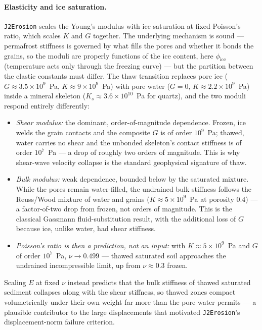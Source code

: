 \documentclass[12pt]{article}
\begin{document}
\paragraph{Elasticity and ice saturation.}
\texttt{J2Erosion} scales the Young's modulus with ice saturation at
fixed Poisson's ratio, which scales $K$ and $G$ together. The
underlying mechanism is sound --- permafrost stiffness is governed by
what fills the pores and whether it bonds the grains, so the moduli
are properly functions of the ice content, here $\phi_{\mathrm{ice}}$
(temperature acts only through the freezing curve) --- but the partition between the elastic constants
must differ. The thaw transition replaces pore ice
($G \approx 3.5 \times 10^{9}$~Pa, $K \approx 9 \times 10^{9}$~Pa)
with pore water ($G = 0$, $K \approx 2.2 \times 10^{9}$~Pa) inside a
mineral skeleton ($K_s \approx 3.6 \times 10^{10}$~Pa for quartz),
and the two moduli respond entirely differently:
\begin{itemize}
\item \emph{Shear modulus:} the dominant, order-of-magnitude
      dependence. Frozen, ice welds the grain contacts and the
      composite $G$ is of order $10^{9}$~Pa; thawed, water carries
      no shear and the unbonded skeleton's contact stiffness is of
      order $10^{7}$~Pa --- a drop of roughly two orders of
      magnitude. This is why shear-wave
      velocity collapse is the standard geophysical signature of
      thaw.
\item \emph{Bulk modulus:} weak dependence, bounded below by the
      saturated mixture. While the pores remain water-filled, the
      undrained bulk stiffness follows the Reuss/Wood mixture of
      water and grains ($K \approx 5 \times 10^{9}$~Pa at porosity
      $0.4$) --- a
      factor-of-two drop from frozen, not orders of magnitude. This
      is the classical Gassmann fluid-substitution result, with the
      additional loss of $G$ because ice, unlike water, had shear
      stiffness.
\item \emph{Poisson's ratio is then a prediction, not an input:}
      with $K \approx 5 \times 10^{9}$~Pa and $G$ of order
      $10^{7}$~Pa, $\nu \to 0.499$
      --- thawed saturated soil approaches the undrained
      incompressible limit, up from $\nu \approx 0.3$ frozen.
\end{itemize}
Scaling $E$ at fixed $\nu$ instead predicts that the bulk stiffness
of thawed saturated sediment collapses along with the shear
stiffness, so thawed zones compact volumetrically under their own
weight far more than the pore water permits --- a plausible
contributor to the large displacements that motivated
\texttt{J2Erosion}'s displacement-norm failure criterion.
\end{document}
